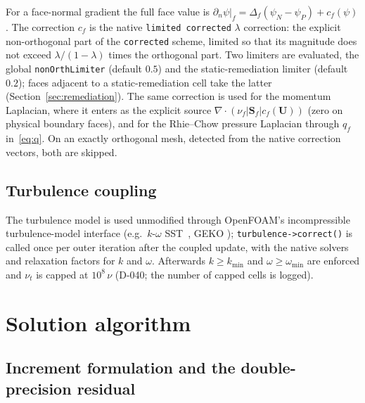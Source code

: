\documentclass[11pt,a4paper]{article}
\newcounter{algorithm}
\newcommand{\vect}[1]{\mathbf{#1}}
\newcommand{\Uv}{\vect{U}}
\newcommand{\Sf}{\vect{S}_f}
\newcommand{\code}[1]{\texttt{#1}}
\begin{document}
For a face-normal gradient the full face value is
$\partial_n\psi|_f=\Delta_f(\psi_N-\psi_P)+c_f(\psi)$. The correction $c_f$ is
the native \code{limited corrected} $\lambda$ correction: the explicit
non-orthogonal part of the \code{corrected} scheme, limited so that its
magnitude does not exceed $\lambda/(1-\lambda)$ times the orthogonal part.
Two limiters are evaluated, the global \code{nonOrthLimiter} (default $0.5$)
and the static-remediation limiter (default $0.2$); faces adjacent to a
static-remediation cell take the latter (Section~\ref{sec:remediation}). The
same correction is used for the momentum Laplacian, where it enters as the
explicit source $\nabla\cdot(\nu_f|\Sf|c_f(\Uv))$ (zero on physical boundary
faces), and for the Rhie--Chow pressure Laplacian through $q_f$
in~\eqref{eq:q}. On an exactly orthogonal mesh, detected from the native
correction vectors, both are skipped.

\subsection{Turbulence coupling}\label{sec:turb}

The turbulence model is used unmodified through OpenFOAM's incompressible
turbulence-model interface (e.g.\ $k$-$\omega$ SST~\cite{Menter1994}, GEKO
\cite{Menter2025GEKO}); \code{turbulence->correct()} is called once per outer
iteration after the coupled update, with the native solvers and relaxation
factors for $k$ and $\omega$. Afterwards $k\ge k_{\min}$ and
$\omega\ge\omega_{\min}$ are enforced and $\nu_t$ is capped at
$10^8\,\nu$ (D-040; the number of capped cells is logged).

\section{Solution algorithm}\label{sec:algo}

\subsection{Increment formulation and the double-precision residual}\label{sec:increment}
\end{document}
